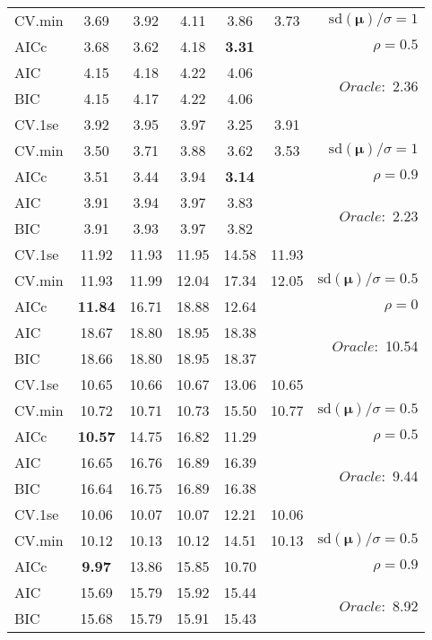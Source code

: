 \begin{table}
\begin{center}
\begin{tabular}{l*{5}{c}|r}
CV.min & 3.69 & 3.92 & 4.11 & 3.86 & 3.73 &  $\mathrm{sd}(\mathbf{\mu})/\sigma=1$ \\
AICc & 3.68 & 3.62 & 4.18 & {\bf 3.31} & & $\rho=0.5$ \\
AIC & 4.15 & 4.18 & 4.22 & 4.06 & &  \multirow{2}{*}{$Oracle: $ 2.36} \\
BIC & 4.15 & 4.17 & 4.22 & 4.06 & &  \\
 \hline 
CV.1se & 3.92 & 3.95 & 3.97 & 3.25 & 3.91 & \\
CV.min & 3.50 & 3.71 & 3.88 & 3.62 & 3.53 &  $\mathrm{sd}(\mathbf{\mu})/\sigma=1$ \\
AICc & 3.51 & 3.44 & 3.94 & {\bf 3.14} & & $\rho=0.9$ \\
AIC & 3.91 & 3.94 & 3.97 & 3.83 & &  \multirow{2}{*}{$Oracle: $ 2.23} \\
BIC & 3.91 & 3.93 & 3.97 & 3.82 & &  \\
 \hline 
CV.1se & 11.92 & 11.93 & 11.95 & 14.58 & 11.93 & \\
CV.min & 11.93 & 11.99 & 12.04 & 17.34 & 12.05 &  $\mathrm{sd}(\mathbf{\mu})/\sigma=0.5$ \\
AICc & {\bf 11.84} & 16.71 & 18.88 & 12.64 & & $\rho=0$ \\
AIC & 18.67 & 18.80 & 18.95 & 18.38 & &  \multirow{2}{*}{$Oracle: $ 10.54} \\
BIC & 18.66 & 18.80 & 18.95 & 18.37 & &  \\
 \hline 
CV.1se & 10.65 & 10.66 & 10.67 & 13.06 & 10.65 & \\
CV.min & 10.72 & 10.71 & 10.73 & 15.50 & 10.77 &  $\mathrm{sd}(\mathbf{\mu})/\sigma=0.5$ \\
AICc & {\bf 10.57} & 14.75 & 16.82 & 11.29 & & $\rho=0.5$ \\
AIC & 16.65 & 16.76 & 16.89 & 16.39 & &  \multirow{2}{*}{$Oracle: $ 9.44} \\
BIC & 16.64 & 16.75 & 16.89 & 16.38 & &  \\
 \hline 
CV.1se & 10.06 & 10.07 & 10.07 & 12.21 & 10.06 & \\
CV.min & 10.12 & 10.13 & 10.12 & 14.51 & 10.13 &  $\mathrm{sd}(\mathbf{\mu})/\sigma=0.5$ \\
AICc & {\bf 9.97} & 13.86 & 15.85 & 10.70 & & $\rho=0.9$ \\
AIC & 15.69 & 15.79 & 15.92 & 15.44 & &  \multirow{2}{*}{$Oracle: $ 8.92} \\
BIC & 15.68 & 15.79 & 15.91 & 15.43 & &  \\
 \hline 
\end{tabular}
\end{center}
\vspace{-1cm}
\end{table}





